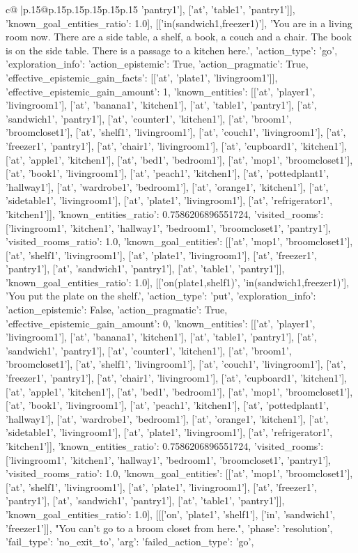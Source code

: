 \documentclass{article}
\begin{document}
{\begin{supertabular}{c@{$\;$}|p{.15\linewidth}@{}p{.15\linewidth}p{.15\linewidth}p{.15\linewidth}p{.15\linewidth}p{.15\linewidth}}
{{{'pantry1'], ['at', 'table1', 'pantry1']], 'known_goal_entities_ratio': 1.0}}], [['in(sandwich1,freezer1)'], 'You are in a living room now. There are a side table, a shelf, a book, a couch and a chair. The book is on the side table. There is a passage to a kitchen here.', {'action_type': 'go', 'exploration_info': {'action_epistemic': True, 'action_pragmatic': True, 'effective_epistemic_gain_facts': [['at', 'plate1', 'livingroom1']], 'effective_epistemic_gain_amount': 1, 'known_entities': [['at', 'player1', 'livingroom1'], ['at', 'banana1', 'kitchen1'], ['at', 'table1', 'pantry1'], ['at', 'sandwich1', 'pantry1'], ['at', 'counter1', 'kitchen1'], ['at', 'broom1', 'broomcloset1'], ['at', 'shelf1', 'livingroom1'], ['at', 'couch1', 'livingroom1'], ['at', 'freezer1', 'pantry1'], ['at', 'chair1', 'livingroom1'], ['at', 'cupboard1', 'kitchen1'], ['at', 'apple1', 'kitchen1'], ['at', 'bed1', 'bedroom1'], ['at', 'mop1', 'broomcloset1'], ['at', 'book1', 'livingroom1'], ['at', 'peach1', 'kitchen1'], ['at', 'pottedplant1', 'hallway1'], ['at', 'wardrobe1', 'bedroom1'], ['at', 'orange1', 'kitchen1'], ['at', 'sidetable1', 'livingroom1'], ['at', 'plate1', 'livingroom1'], ['at', 'refrigerator1', 'kitchen1']], 'known_entities_ratio': 0.7586206896551724, 'visited_rooms': ['livingroom1', 'kitchen1', 'hallway1', 'bedroom1', 'broomcloset1', 'pantry1'], 'visited_rooms_ratio': 1.0, 'known_goal_entities': [['at', 'mop1', 'broomcloset1'], ['at', 'shelf1', 'livingroom1'], ['at', 'plate1', 'livingroom1'], ['at', 'freezer1', 'pantry1'], ['at', 'sandwich1', 'pantry1'], ['at', 'table1', 'pantry1']], 'known_goal_entities_ratio': 1.0}}], [['on(plate1,shelf1)', 'in(sandwich1,freezer1)'], 'You put the plate on the shelf.', {'action_type': 'put', 'exploration_info': {'action_epistemic': False, 'action_pragmatic': True, 'effective_epistemic_gain_amount': 0, 'known_entities': [['at', 'player1', 'livingroom1'], ['at', 'banana1', 'kitchen1'], ['at', 'table1', 'pantry1'], ['at', 'sandwich1', 'pantry1'], ['at', 'counter1', 'kitchen1'], ['at', 'broom1', 'broomcloset1'], ['at', 'shelf1', 'livingroom1'], ['at', 'couch1', 'livingroom1'], ['at', 'freezer1', 'pantry1'], ['at', 'chair1', 'livingroom1'], ['at', 'cupboard1', 'kitchen1'], ['at', 'apple1', 'kitchen1'], ['at', 'bed1', 'bedroom1'], ['at', 'mop1', 'broomcloset1'], ['at', 'book1', 'livingroom1'], ['at', 'peach1', 'kitchen1'], ['at', 'pottedplant1', 'hallway1'], ['at', 'wardrobe1', 'bedroom1'], ['at', 'orange1', 'kitchen1'], ['at', 'sidetable1', 'livingroom1'], ['at', 'plate1', 'livingroom1'], ['at', 'refrigerator1', 'kitchen1']], 'known_entities_ratio': 0.7586206896551724, 'visited_rooms': ['livingroom1', 'kitchen1', 'hallway1', 'bedroom1', 'broomcloset1', 'pantry1'], 'visited_rooms_ratio': 1.0, 'known_goal_entities': [['at', 'mop1', 'broomcloset1'], ['at', 'shelf1', 'livingroom1'], ['at', 'plate1', 'livingroom1'], ['at', 'freezer1', 'pantry1'], ['at', 'sandwich1', 'pantry1'], ['at', 'table1', 'pantry1']], 'known_goal_entities_ratio': 1.0}}], [[['on', 'plate1', 'shelf1'], ['in', 'sandwich1', 'freezer1']], "You can't go to a broom closet from here.", {'phase': 'resolution', 'fail_type': 'no_exit_to', 'arg': {'failed_action_type': 'go', }}}
\end{supertabular}}
\end{document}
